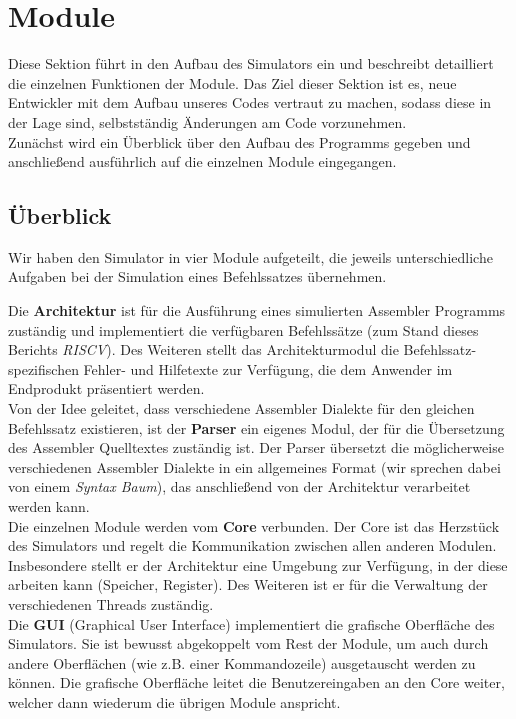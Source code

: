 
\section{Module}

Diese Sektion führt in den Aufbau des Simulators ein und beschreibt detailliert
die einzelnen Funktionen der Module. Das Ziel dieser Sektion ist es, neue
Entwickler mit dem Aufbau unseres Codes vertraut zu machen, sodass diese in der
Lage sind, selbstständig Änderungen am Code vorzunehmen. \\
Zunächst wird ein Überblick über den Aufbau des Programms gegeben und
anschließend ausführlich auf die einzelnen Module eingegangen.

\subsection{Überblick}

Wir haben den Simulator in vier Module aufgeteilt, die jeweils unterschiedliche
Aufgaben bei der Simulation eines Befehlssatzes übernehmen.

Die \textbf{Architektur} ist für die Ausführung eines simulierten Assembler
Programms zuständig und implementiert die verfügbaren Befehlssätze (zum Stand
dieses Berichts \textit{RISCV}). Des Weiteren stellt das Architekturmodul die
Befehlssatz-spezifischen Fehler- und Hilfetexte zur Verfügung, die dem Anwender
im Endprodukt präsentiert werden. \\ Von der Idee geleitet, dass verschiedene
Assembler Dialekte für den gleichen Befehlssatz existieren, ist der
\textbf{Parser} ein eigenes Modul, der für die Übersetzung des Assembler
Quelltextes zuständig ist. Der Parser übersetzt die möglicherweise verschiedenen
Assembler Dialekte in ein allgemeines Format (wir sprechen dabei von einem
\textit{Syntax Baum}), das anschließend von der Architektur verarbeitet werden
kann. \\
Die einzelnen Module werden vom \textbf{Core} verbunden. Der Core ist das
Herzstück des Simulators und regelt die Kommunikation zwischen allen anderen
Modulen. Insbesondere stellt er der Architektur eine Umgebung zur Verfügung, in
der diese arbeiten kann (Speicher, Register). Des Weiteren ist er für die
Verwaltung der verschiedenen Threads zuständig. \\
Die \textbf{GUI} (Graphical User Interface) implementiert die grafische
Oberfläche des Simulators. Sie ist bewusst abgekoppelt vom Rest der Module,
um auch durch andere Oberflächen (wie z.B. einer Kommandozeile) ausgetauscht
werden zu können. Die grafische Oberfläche leitet die Benutzereingaben an den
Core weiter, welcher dann wiederum die übrigen Module anspricht.








